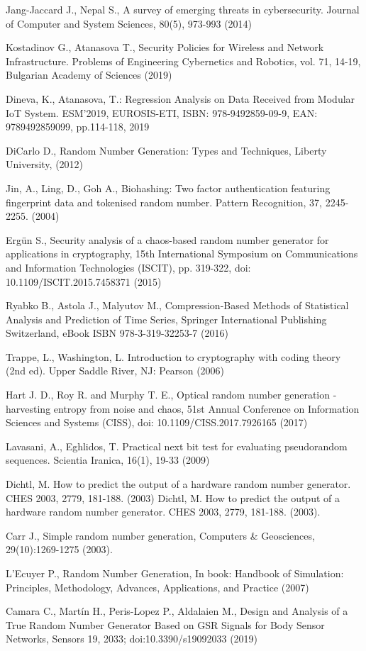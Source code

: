 \documentclass[runningheads]{llncs}
\begin{document}
\begin{thebibliography}{8}
 Jang-Jaccard J., Nepal S., A survey of emerging threats in cybersecurity. Journal of Computer and System Sciences, 80(5), 973-993 (2014)

 Kostadinov G., Atanasova T., Security Policies for Wireless and Network Infrastructure. Problems of Engineering Cybernetics and Robotics, vol. 71, 14-19, Bulgarian Academy of Sciences (2019)

 Dineva, K., Atanasova, T.: Regression Analysis on Data Received from Modular IoT System. ESM’2019, EUROSIS-ETI, ISBN: 978-9492859-09-9, EAN: 9789492859099, pp.114-118, 2019

 DiCarlo D., Random Number Generation: Types and Techniques, Liberty University, (2012)

 Jin, A., Ling, D., Goh A., Biohashing: Two factor authentication featuring fingerprint data and tokenised random number. Pattern Recognition, 37, 2245- 2255. (2004)

 Ergün S., Security analysis of a chaos-based random number generator for applications in cryptography, 15th International Symposium on Communications and Information Technologies (ISCIT), pp. 319-322, doi: 10.1109/ISCIT.2015.7458371 (2015)

 Ryabko B., Astola J., Malyutov M., Compression-Based Methods of Statistical Analysis and Prediction of Time Series, Springer International Publishing Switzerland, eBook ISBN 978-3-319-32253-7 (2016)

 Trappe, L., Washington, L. Introduction to cryptography with coding theory (2nd ed). Upper Saddle River, NJ: Pearson (2006)

 Hart J. D., Roy R. and Murphy T. E., Optical random number generation - harvesting entropy from noise and chaos, 51st Annual Conference on Information Sciences and Systems (CISS), doi: 10.1109/CISS.2017.7926165 (2017)

 Lavasani, A., Eghlidos, T. Practical next bit test for evaluating pseudorandom sequences. Scientia Iranica, 16(1), 19-33 (2009)

 Dichtl, M. How to predict the output of a hardware random number generator. CHES 2003, 2779, 181-188. (2003) Dichtl, M. How to predict the output of a hardware random number generator. CHES 2003, 2779, 181-188. (2003).

 Carr J., Simple random number generation, Computers \& Geosciences, 29(10):1269-1275 (2003).

 L’Ecuyer P., Random Number Generation, In book: Handbook of Simulation: Principles, Methodology, Advances, Applications, and Practice (2007)

 Camara C., Martín H., Peris-Lopez P., Aldalaien M., Design and Analysis of a True Random Number Generator Based on GSR Signals for Body Sensor Networks, Sensors 19, 2033; doi:10.3390/s19092033 (2019)

\end{thebibliography}
\end{document}
